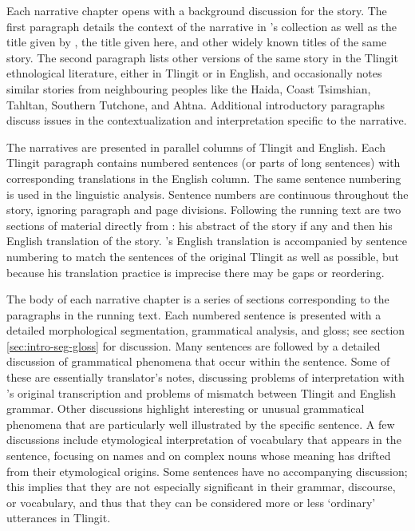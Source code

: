 Each narrative chapter opens with a background discussion for the story.
The first paragraph details the context of the narrative in \citeauthor{swanton:1909}’s collection as well as the title given by \citeauthor{swanton:1909}, the title given here, and other widely known titles of the same story.
The second paragraph lists other versions of the same story in the Tlingit ethnological literature, either in Tlingit or in English, and occasionally notes similar stories from neighbouring peoples like the Haida, Coast Tsimshian, Tahltan, Southern Tutchone, and Ahtna.
Additional introductory paragraphs discuss issues in the contextualization and interpretation specific to the narrative.

The narratives are presented in parallel columns of Tlingit and English.
Each Tlingit paragraph contains numbered sentences (or parts of long sentences) with corresponding translations in the English column.
The same sentence numbering is used in the linguistic analysis.
Sentence numbers are continuous throughout the story, ignoring paragraph and page divisions.
Following the running text are two sections of material directly from \citeauthor{swanton:1909}: his abstract of the story if any and then his English translation of the story.
\citeauthor{swanton:1909}’s English translation is accompanied by sentence numbering to match the sentences of the original Tlingit as well as possible, but because his translation practice is imprecise there may be gaps or reordering.

The body of each narrative chapter is a series of sections corresponding to the paragraphs in the running text.
Each numbered sentence is presented with a detailed morphological segmentation, grammatical analysis, and gloss; see section \ref{sec:intro-seg-gloss} for discussion.
Many sentences are followed by a detailed discussion of grammatical phenomena that occur within the sentence.
Some of these are essentially translator’s notes, discussing problems of interpretation with \citeauthor{swanton:1909}’s original transcription and problems of mismatch between Tlingit and English grammar.
Other discussions highlight interesting or unusual grammatical phenomena that are particularly well illustrated by the specific sentence.
A few discussions include etymological interpretation of vocabulary that appears in the sentence, focusing on names and on complex nouns whose meaning has drifted from their etymological origins.
Some sentences have no accompanying discussion; this implies that they are not especially significant in their grammar, discourse, or vocabulary, and thus that they can be considered more or less ‘ordinary’ utterances in Tlingit.

